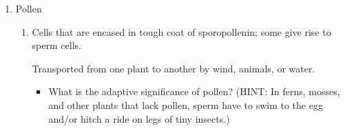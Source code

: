 \begin{frame}[t]
    \begin{adjustwidth}{-2em}{-1.5em}

        \begin{enumerate}
            \addtocounter{enumi}{3}
            \item Pollen
            \begin{enumerate}
                \item Cells that are encased in tough coat of sporopollenin;
                    some give rise to sperm cells.

                    \vspace{2mm}
                    Transported from one plant to another by wind, animals, or
                    water.

                \begin{itemize}
                    \item What is the adaptive significance of pollen?  (HINT:
                        In ferns, mosses, and other plants that lack pollen,
                        sperm have to swim to the egg and/or hitch a ride on
                        legs of tiny insects.)


                \end{itemize}
            \end{enumerate}
        \end{enumerate}
    \end{adjustwidth}
\end{frame}

